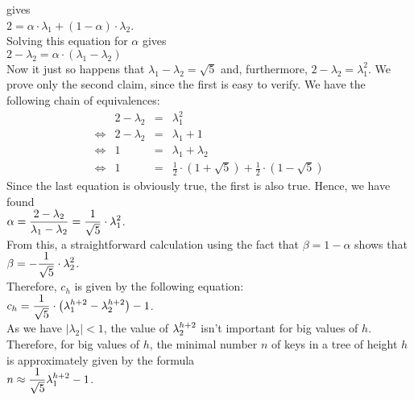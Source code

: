 gives
\\[0.2cm]
\hspace*{1.3cm}
$2 = \alpha \cdot \lambda_1 + (1-\alpha) \cdot \lambda_2$.
\\[0.2cm]
Solving this equation for $\alpha$ gives
\\[0.2cm]
\hspace*{1.3cm}
$2 - \lambda_2 = \alpha \cdot (\lambda_1 - \lambda_2)$
\\[0.2cm]
Now it just so happens that $\lambda_1 - \lambda_2 = \sqrt{5}$ and, furthermore, $2 - \lambda_2 = \lambda_1^2$.
We prove only the second claim, since the first is easy to verify.  We have the following
chain of equivalences:
$$
\begin{array}{crcl}
                  & 2 - \lambda_2 & = & \lambda_1^2            \\[0.2cm]
  \Leftrightarrow & 2 - \lambda_2 & = & \lambda_1 + 1          \\[0.2cm]
  \Leftrightarrow & 1             & = & \lambda_1 + \lambda_2  \\[0.2cm]
  \Leftrightarrow & 1             & = &\frac{1}{2} \cdot (1 + \sqrt{5}) + \frac{1}{2} \cdot (1 - \sqrt{5}) 
\end{array}
$$
Since the last equation is obviously true, the first is also true.
Hence, we have found
\\[0.2cm]
\hspace*{1.3cm}
$\displaystyle \alpha = \frac{2 - \lambda_2}{\lambda_1 - \lambda_2} = \frac{1}{\sqrt{5}} \cdot \lambda_1^2$.
\\[0.2cm]
From this, a straightforward calculation using the fact that $\beta = 1 - \alpha$ shows that 
\\[0.2cm]
\hspace*{1.3cm}
$\displaystyle \beta  = -\frac{1}{\sqrt{5}} \cdot \lambda_2^2$.
\\[0.2cm]
Therefore, $c_h$ is given by the following equation:
\\[0.2cm]
\hspace*{1.3cm}
$c_h = \displaystyle \frac{1}{\sqrt{5}} \cdot \left( \lambda_1^{h+2} - \lambda_2^{h+2} \right) -1$.  
\\[0.2cm]
As we have  $|\lambda_2| < 1$, the value of  $\displaystyle\lambda_2^{h+2}$ isn't important for big
values of $h$.  Therefore, for big values of $h$, the minimal number  $n$ of keys in a tree of
height  $h$ is approximately given by the formula \\[0.2cm]
\hspace*{1.3cm} $n \approx \displaystyle \frac{1}{\sqrt{5}} \lambda_1^{h+2} - 1$. \\[0.2cm]
